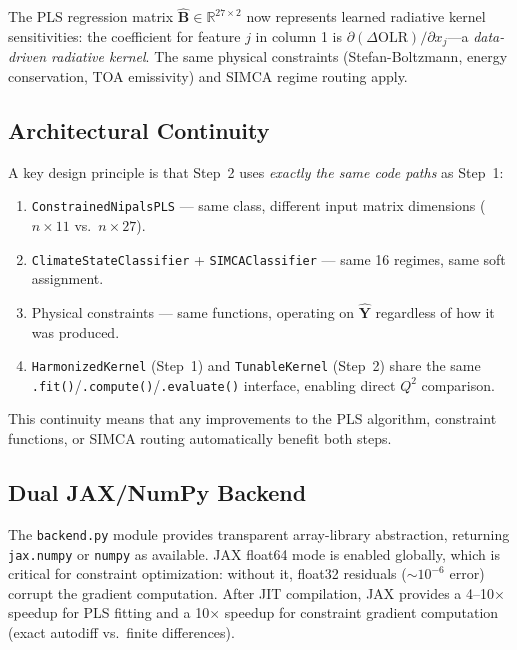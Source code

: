 \documentclass[11pt]{article}
\newcommand{\Qsq}{Q^{2}}
\begin{document}
The PLS regression matrix $\hat{\mathbf{B}} \in \mathbb{R}^{27
\times 2}$ now represents learned radiative kernel sensitivities:
the coefficient for feature $j$ in column 1 is $\partial
(\Delta\text{OLR}) / \partial x_j$---a \emph{data-driven radiative
kernel}. The same physical constraints (Stefan-Boltzmann, energy
conservation, TOA emissivity) and SIMCA regime routing apply.

\subsection{Architectural Continuity}

A key design principle is that Step~2 uses \emph{exactly the same
code paths} as Step~1:

\begin{enumerate}[noitemsep]
  \item \texttt{ConstrainedNipalsPLS} --- same class, different
    input matrix dimensions ($n \times 11$ vs.\ $n \times 27$).
  \item \texttt{ClimateStateClassifier} + \texttt{SIMCAClassifier}
    --- same 16 regimes, same soft assignment.
  \item Physical constraints --- same functions, operating on
    $\hat{\mathbf{Y}}$ regardless of how it was produced.
  \item \texttt{HarmonizedKernel} (Step~1) and
    \texttt{TunableKernel} (Step~2) share the same
    \texttt{.fit()}/\texttt{.compute()}/\texttt{.evaluate()}
    interface, enabling direct $\Qsq$ comparison.
\end{enumerate}

This continuity means that any improvements to the PLS algorithm,
constraint functions, or SIMCA routing automatically benefit both
steps.

\subsection{Dual JAX/NumPy Backend}

The \texttt{backend.py} module provides transparent array-library
abstraction, returning \texttt{jax.numpy} or \texttt{numpy} as
available. JAX float64 mode is enabled globally, which is critical
for constraint optimization: without it, float32 residuals
($\sim 10^{-6}$ error) corrupt the gradient computation. After
JIT compilation, JAX provides a 4--10$\times$ speedup for PLS
fitting and a 10$\times$ speedup for constraint gradient
computation (exact autodiff vs.\ finite differences).
\end{document}
